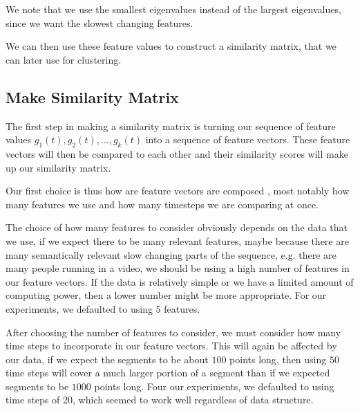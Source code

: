 We note that we use the smallest eigenvalues instead of the largest eigenvalues, since we want the slowest changing features.

We can then use these feature values to construct a similarity matrix, that we can later use for clustering.
\subsection{Make Similarity Matrix}
The first step in making a similarity matrix is turning our sequence of feature values $g_1(t),g_2(t),\ldots,g_k(t)$  into a sequence of feature vectors. These feature vectors will then be compared to each other and their similarity scores will make up our similarity matrix.

Our first choice is thus how are feature vectors are composed , most notably how many features we use and how many timesteps we are comparing at once.

The choice of how many features to consider obviously depends on the data that we use, if we expect there to be many relevant features, maybe because there are many semantically relevant slow changing parts of the sequence, e.g. there are many people running in a video, we should be using a high number of features in our feature vectors. If the data is relatively simple or we have a limited amount of computing power, then a lower number might be more appropriate.  For our experiments, we defaulted to using 5 features. 

After choosing the number of features to consider, we must consider how many time steps to incorporate in our feature vectors. This will again be affected  by our data, if we expect the segments to be about $100$ points long, then using $50$ time steps will cover a much larger portion of a segment than if we expected segments to be $1000$ points long.  Four our experiments, we defaulted to using time steps of  20, which seemed to work well regardless of data structure.

